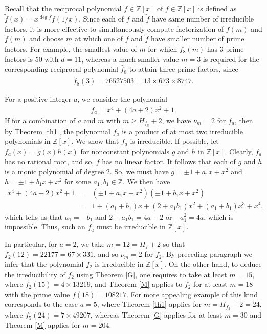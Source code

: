 \documentclass[12pt,reqno]{amsart}%
\begin{document}
\begin{remark}
Recall that the reciprocal polynomial $\tilde{f}\in \mathbb{Z}[x]$ of $f\in \mathbb{Z}[x]$ is defined as
$\tilde{f}(x)=x^{\deg f}f(1/x)$.
Since each of $f$ and $\tilde{f}$ have same number of irreducible factors, it is more effective to simultaneously compute factorization of $f(m)$ and $\tilde{f}(m)$ and choose $m$ at which one of  $f$ and $\tilde{f}$ have smaller number of prime factors. For example, the smallest value of $m$ for which $f_8(m)$ has 3 prime factors is 50 with $d=11$, whereas a much smaller value $m=3$ is required for the corresponding reciprocal polynomial $\tilde{f_8}$ to attain three prime factors, since
\begin{eqnarray*}
\tilde{f_8}(3)=76527503=13\times 673\times8747.
\end{eqnarray*}
\end{remark}
\begin{remark}
For a positive integer $a$, we consider the polynomial
\begin{eqnarray*}
f_a=x^4+(4a+2)x^2+1.
\end{eqnarray*}
If for a combination of $a$ and $m$ with $m\geq H_{f_a}+2$, we have $\nu_m=2$ for $f_a$, then by Theorem  \ref{th1}, the polynomial $f_a$ is a product of at most two irreducible polynomials in $\mathbb Z[x]$. We show that $f_a$ is irreducible. If possible, let $f_a(x)=g(x)h(x)$ for nonconstant polynomials $g$ and $h$ in $\mathbb Z[x]$. Clearly, $f_a$ has no rational root, and so, $f$ has no linear factor. It follows that each of $g$ and $h$ is a monic polynomial of degree $2$. So, we must have $g=\pm1+a_1 x+x^2$ and $h=\pm 1+b_1x+x^2$ for some $a_1,b_1\in \mathbb Z$. We then have
\begin{eqnarray*}
x^4+(4a+2)x^2+1 &=&  (\pm1+a_1 x+x^2)(\pm 1+b_1x+x^2)\\&=&1+(a_1+b_1)x+(2+a_1b_1)x^2+(a_1+b_1)x^3+x^4,
\end{eqnarray*}
which tells us that $a_1=-b_1$ and $2+a_1b_1=4a+2$ or $-a_1^2=4a$, which is impossible. Thus, such an $f_a$ must be irreducible in $\mathbb Z[x]$.

In particular, for $a=2$, we take $m=12=H_f+2$ so that  $f_2(12)=22177=67\times331$, and so $\nu_m=2$ for $f_2$. By preceding paragraph we infer that the polynomial $f_2$ is irreducible in $\mathbb Z[x]$. On the other hand, to deduce the irreducibility of $f_2$ using Theorem \ref{G}, one requires to take at least $m=15$, where  $f_2(15)=4\times 13219$, and Theorem \ref{M} applies to $f_2$ for at least $m=18$ with the prime value $f(18)=108217$.  For more appealing example of this kind corresponds to the case $a=5$, where Theorem \ref{th1} applies for $m=H_{f_5}+2=24$, where $f_5(24)=7\times 49207$, whereas Theorem \ref{G} applies for at least $m=30$ and Theorem \ref{M} applies for $m=204$.
\end{remark}
\end{document}
